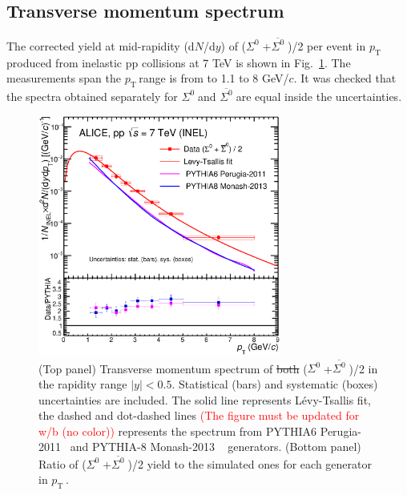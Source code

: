 \documentclass[ALICE,manyauthors]{cernphprep}
\newcommand{\sig}{\ensuremath{\Sigma^0  \; }}
\newcommand{\asig}{\ensuremath{\overline{\Sigma^0} \; }}
\newcommand{\pt}{\ensuremath{p_{\mathrm{T}\; }}}
\newcommand{\red}{\textcolor{red}}
\providecommand{\DIFdeltex}[1]{{\protect\color{red}\sout{#1}}}                      %
\providecommand{\DIFdelFL}[1]{\DIFdel{#1}} %
\providecommand{\DIFdelbeginFL}{} %
\providecommand{\DIFdelendFL}{} %
\providecommand{\DIFdel}[1]{\texorpdfstring{\DIFdeltex{#1}}{}} %
\begin{document}
 \subsection{Transverse momentum spectrum} 
 \label{subsec:pT}

The corrected yield at mid-rapidity (d$N$/d$y$) of (\sig+\asig)/2 per event in \pt produced from inelastic pp collisions 
at 7 TeV is shown in Fig.~\ref{fig:spectra}. The measurements span the \pt range is from to 1.1 to 8 GeV/$c$. 
It was checked that the spectra obtained separately for \sig and \asig are equal inside the uncertainties.

\begin{figure}[h!]
\centering
 \includegraphics[width=8.0cm]{Figure/CM-6feb18-Data-LTfit-Pyt6-Pyt8.eps}

  \caption{(Top panel) Transverse momentum spectrum of \DIFdelbeginFL \DIFdelFL{both }\DIFdelendFL (\sig+\asig)/2 in  the rapidity range $|y|<0.5$. 
  Statistical (bars) and systematic (boxes) uncertainties are included. The solid line
  represents L\'{e}vy-Tsallis fit, the dashed and dot-dashed lines \red{(The figure must be updated for w/b (no color))} 
  represents the spectrum from PYTHIA6 Perugia-2011~\cite{cite:pythia6} and PYTHIA-8 Monash-2013
  ~\cite{cite:PYTHIA-8-Monash-gener} generators.
  (Bottom panel) Ratio of (\sig+\asig)/2 yield to the simulated ones for each generator in \pt.
  }
 \label{fig:spectra}
\end{figure}
\end{document}
